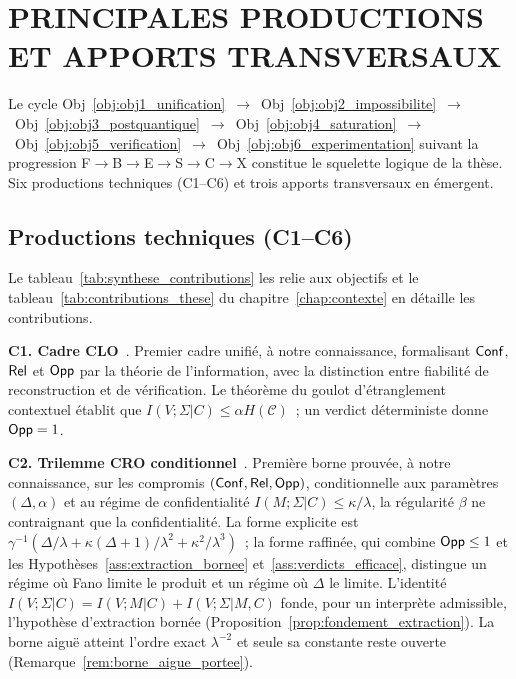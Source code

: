 \section{PRINCIPALES PRODUCTIONS ET APPORTS TRANSVERSAUX}
\label{sec:cg_contributions}
\begin{sloppypar}

Le cycle Obj~\ref{obj:obj1_unification}~$\to$~Obj~\ref{obj:obj2_impossibilite}~$\to$~Obj~\ref{obj:obj3_postquantique}~$\to$~Obj~\ref{obj:obj4_saturation}~$\to$~Obj~\ref{obj:obj5_verification}~$\to$~Obj~\ref{obj:obj6_experimentation} suivant la progression
F$\to$B$\to$E$\to$S$\to$C$\to$X
constitue le squelette logique de la th\`ese. Six productions
techniques (C1--C6) et trois apports transversaux en \'emergent.

\subsection*{Productions techniques (C1--C6)}

Le tableau~\ref{tab:synthese_contributions} les relie aux objectifs et le
tableau~\ref{tab:contributions_these} du chapitre~\ref{chap:contexte} en d\'etaille les contributions.


\textbf{C1. Cadre CLO}~\cite{MINKA2026CLO}. Premier cadre unifi\'e, \`a notre connaissance,
formalisant $\mathsf{Conf}$, $\mathsf{Rel}$ et $\mathsf{Opp}$ par la th\'eorie de l'information, avec
la distinction entre fiabilit\'e de reconstruction et de v\'erification.
Le th\'eor\`eme du goulot d'\'etranglement contextuel \'etablit que
$I(V;\Sigma|C) \leq \alpha H(\mathcal{C})$~; un verdict d\'eterministe donne $\mathsf{Opp} = 1$.

\textbf{C2. Trilemme CRO conditionnel}~\cite{MINKA2026CRO}. Premi\`ere
borne prouv\'ee, \`a notre connaissance, sur les compromis $(\mathsf{Conf}, \mathsf{Rel}, \mathsf{Opp})$, conditionnelle
aux param\`etres $(\Delta, \alpha)$ et au r\'egime de
confidentialit\'e $I(M;\Sigma|C) \leq \kappa/\lambda$, la r\'egularit\'e $\beta$ ne
contraignant que la confidentialit\'e. La forme explicite
est $\gamma^{-1}(\Delta/\lambda + \kappa(\Delta+1)/\lambda^2 + \kappa^2/\lambda^3)$~;
la forme raffin\'ee, qui combine $\mathsf{Opp} \leq 1$ et les
Hypoth\`eses~\ref{ass:extraction_bornee} et~\ref{ass:verdicts_efficace}, distingue
un r\'egime o\`u Fano limite le produit et un r\'egime o\`u $\Delta$ le limite.
L'identit\'e $I(V;\Sigma|C) = I(V;M|C) + I(V;\Sigma|M,C)$ fonde, pour un interpr\`ete
admissible, l'hypoth\`ese d'extraction born\'ee
(Proposition~\ref{prop:fondement_extraction}). La borne aigu\"e atteint l'ordre exact
$\lambda^{-2}$ et seule sa constante reste ouverte
(Remarque~\ref{rem:borne_aigue_portee}).


\end{sloppypar}
